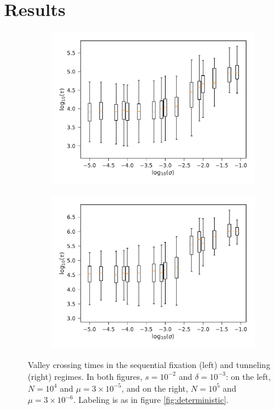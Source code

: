 \documentclass[rmp]{revtex4}
\begin{document}
\section*{Results}

\begin{figure}
\begin{subfigure}[b]{0.4\textwidth}
\includegraphics[width=\textwidth]{Figures/seq_fix.pdf}
\end{subfigure}
\begin{subfigure}[b]{0.4\textwidth}
\includegraphics[width=\textwidth]{Figures/neut_tunnel.pdf}
\end{subfigure}
\caption{Valley crossing times in the sequential fixation (left) and tunneling (right) regimes. In both figures, $s = 10^{-2}$ and $\delta = 10^{-3}$: on the left, $N = 10^4$ and $\mu = 3\times 10^{-5}$, and on the right, $N = 10^5$ and $\mu = 3\times 10^{-6}$. Labeling is as in figure \ref{fig:deterministic}.}
\label{fig:tunneling}
\end{figure}
\end{document}
